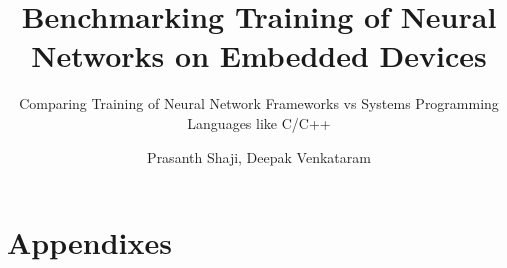 \documentclass[a4paper]{UUThesisTemplate}
\author{Prasanth Shaji, Deepak Venkataram}
\title{Benchmarking Training of Neural Networks on Embedded Devices}
\subtitle{Comparing Training of Neural Network Frameworks vs Systems Programming Languages like C/C++}
\begin{document}
\frontmatter
	\frontmatterCS



	\begingroup
		\tableofcontents
	\endgroup


\mainmatter
	
	
	

\backmatter
	\nocite{*} %
	
	

	\part{Appendixes}
	
\end{document}
